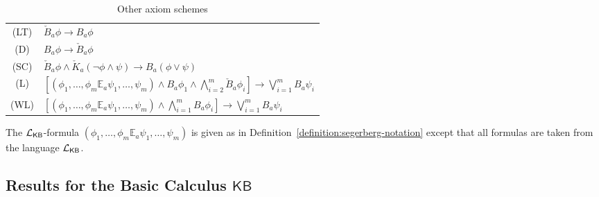 \documentclass[12pt]{article}
\theoremstyle{definition}
\newcommand{\Lang}{{\cal L}}   %
\newcommand{\KB}{{\mathsf{KB}}}                     %
\begin{document}
\begin{table}[h]
  \begin{center}
    \renewcommand{\arraystretch}{1.3}
    \begin{tabular}[t]{cl}
      (LT) &
      $\check B_a\phi\to B_a\phi$
      \\
      (D) &
      $B_a\phi\to \check B_a\phi$
      \\
      (SC) &
      $\check B_a\phi \land 
      \check K_a(\lnot\phi\land\psi) \to 
      B_a(\phi\lor\psi)$
      \\
      (L) &
      $\textstyle [(\phi_1,\dots,\phi_m\mathbb{E}_a\psi_1,\dots,\psi_m)
      \land B_a\phi_1 \land \bigwedge_{i=2}^m \check B_a\phi_i] \to
      \bigvee_{i=1}^m B_a\psi_i$
      \\
      (WL) &
      $\textstyle [(\phi_1,\dots,\phi_m\mathbb{E}_a\psi_1,\dots,\psi_m)
      \land \bigwedge_{i=1}^m B_a\phi_i] \to
      \bigvee_{i=1}^m B_a\psi_i$
      \\
    \end{tabular}
    
    \bigskip
    \begin{minipage}{.9\textwidth}
      The $\Lang_\KB$-formula
      $(\phi_1,\dots,\phi_m\mathbb{E}_a\psi_1,\dots,\psi_m)$ is given
      as in Definition~\ref{definition:segerberg-notation} except that
      all formulas are taken from the language $\Lang_\KB$.
    \end{minipage}
  \end{center}
    \caption{Other axiom schemes}
  \label{table:other-schemes}
\end{table}

\subsection{Results for the Basic Calculus $\KB$}
\end{document}
